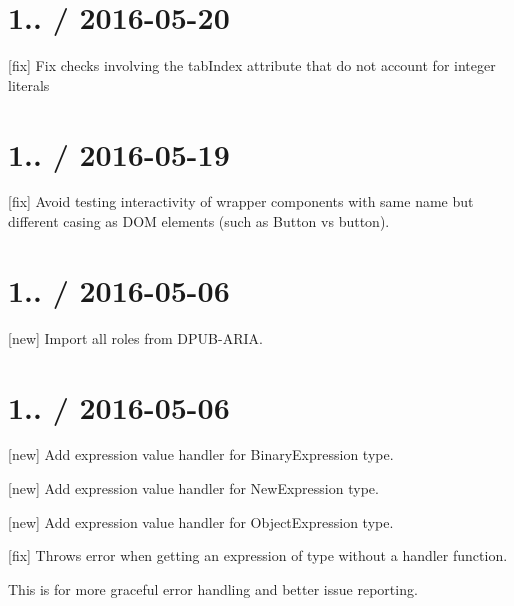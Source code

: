 \section*{1.. / 2016-\/05-\/20 }


\begin{DoxyItemize}
\item \mbox{[}fix\mbox{]} Fix checks involving the tab\+Index attribute that do not account for integer literals
\end{DoxyItemize}

\section*{1.. / 2016-\/05-\/19 }


\begin{DoxyItemize}
\item \mbox{[}fix\mbox{]} Avoid testing interactivity of wrapper components with same name but different casing as D\+OM elements (such as {\ttfamily Button} vs {\ttfamily button}).
\end{DoxyItemize}

\section*{1.. / 2016-\/05-\/06 }


\begin{DoxyItemize}
\item \mbox{[}new\mbox{]} Import all roles from D\+P\+U\+B-\/\+A\+R\+IA.
\end{DoxyItemize}

\section*{1.. / 2016-\/05-\/06 }


\begin{DoxyItemize}
\item \mbox{[}new\mbox{]} Add expression value handler for {\ttfamily Binary\+Expression} type.
\item \mbox{[}new\mbox{]} Add expression value handler for {\ttfamily New\+Expression} type.
\item \mbox{[}new\mbox{]} Add expression value handler for {\ttfamily Object\+Expression} type.
\item \mbox{[}fix\mbox{]} Throws error when getting an expression of type without a handler function.
\begin{DoxyItemize}
\item This is for more graceful error handling and better issue reporting.
\end{DoxyItemize}
\end{DoxyItemize}

